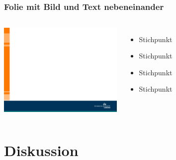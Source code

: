 \subsection*{}
\begin{frame}
\frametitle{Folie mit Bild und Text nebeneinander}
	\begin{columns}
		\column{6cm}
		\vskip5mm
		\includegraphics[width=6.0cm]{style/images/master_background}\\
		\vskip5mm
    	\column{5cm}
      	\vspace{-1cm}
		\begin{itemize}
		 \item Stichpunkt\newline
      	 \item Stichpunkt\newline
       	 \item Stichpunkt\newline
     	 \item Stichpunkt\newline
		\end{itemize}
	\end{columns}
\end{frame}

\section{Diskussion}
